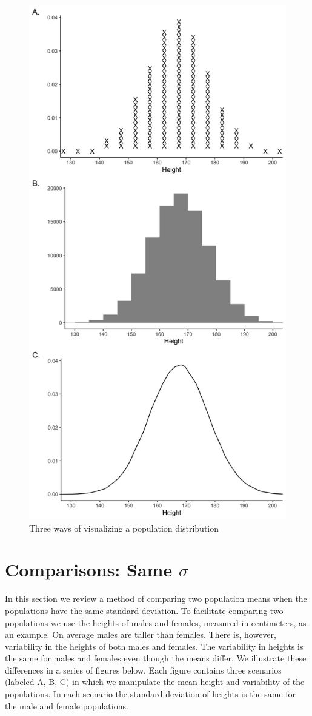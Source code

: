 \documentclass[
]{krantz}
\begin{document}
\begin{figure}
\includegraphics[width=0.8\linewidth,height=0.8\textheight]{ch_populations/images/popvisual} \caption{Three ways of visualizing a population distribution}\label{fig:popvisual3}
\end{figure}

\hypertarget{comparisons-same-sigma}{%
\section{\texorpdfstring{Comparisons: Same \(\sigma\)}{Comparisons: Same \textbackslash sigma}}\label{comparisons-same-sigma}}

In this section we review a method of comparing two population means when the populations have the same standard deviation. To facilitate comparing two populations we use the heights of males and females, measured in centimeters, as an example. On average males are taller than females. There is, however, variability in the heights of both males and females. The variability in heights is the same for males and females even though the means differ. We illustrate these differences in a series of figures below. Each figure contains three scenarios (labeled A, B, C) in which we manipulate the mean height and variability of the populations. In each scenario the standard deviation of heights is the same for the male and female populations.
\end{document}
